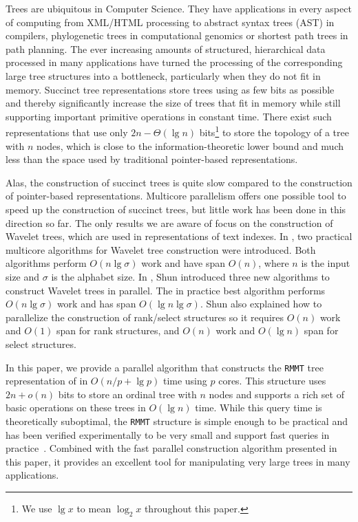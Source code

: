 Trees are ubiquitous in Computer Science.  They have applications in
every aspect of computing from XML/HTML processing to abstract syntax
trees (AST) in compilers, phylogenetic trees in computational genomics
or shortest path trees in path planning.  The ever increasing amounts
of structured, hierarchical data processed in many applications have
turned the processing of the corresponding large tree structures into
a bottleneck, particularly when they do not fit in memory.  Succinct
tree representations store trees using as few bits as possible and
thereby significantly increase the size of trees that fit in memory
while still supporting important primitive operations in constant
time.  There exist such representations that use only $2n - \Theta(\lg
n)$ bits\footnote{We use $\lg x$ to mean $\log_{2}x$ throughout this
paper.} to store the topology of a tree with $n$ nodes, which is close
to the information-theoretic lower bound and much less than the space
used by traditional pointer-based representations.

Alas, the construction of succinct trees is quite slow compared to the
construction of pointer-based representations.  Multicore parallelism
offers one possible tool to speed up the construction of succinct
trees, but little work has been done in this direction so far.  The
only results we are aware of focus on the construction of Wavelet
trees, which are used in representations of text indexes.  In
\cite{Fuentes2014}, two practical multicore algorithms for Wavelet
tree construction were introduced.  Both algorithms perform $O(n\lg
\sigma)$ work and have span $O(n)$, where $n$ is the input size and
$\sigma$ is the alphabet size.  In \cite{DBLP:journals/corr/Shun14},
Shun introduced three new algorithms to construct Wavelet trees in
parallel.  The in practice best algorithm performs $O(n\lg \sigma)$
work and has span $O(\lg n\lg \sigma)$.  Shun also explained how to
parallelize the construction of rank/select structures so it requires
$O(n)$ work and $O(1)$ span for rank structures, and $O(n)$ work and
$O(\lg n)$ span for select structures.

In this paper, we provide a parallel algorithm that constructs the
{\tt RMMT} tree representation of
\cite{Navarro:2014:FFS:2620785.2601073} in $O(n/p + \lg p)$ time
using $p$ cores.  This structure uses $2n + o(n)$ bits to store an
ordinal tree with $n$ nodes and supports a rich set of basic
operations on these trees in $O(\lg n)$ time.  While this query time
is theoretically suboptimal, the {\tt RMMT} structure is simple enough
to be practical and has been verified experimentally to be very small
and support fast queries in practice~\cite{ACNSalenex10}.  Combined
with the fast parallel construction algorithm presented in this paper,
it provides an excellent tool for manipulating very large trees in
many applications.

